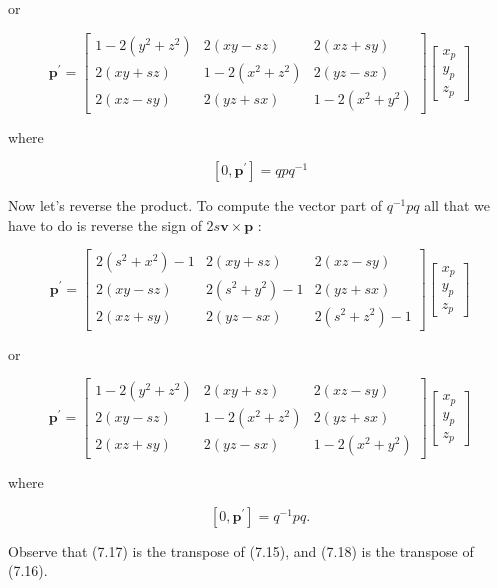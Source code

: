 or

$$
\mathbf{p}^{\prime}=\left[\begin{array}{ccc}
1-2\left(y^{2}+z^{2}\right) & 2(x y-s z) & 2(x z+s y) \\
2(x y+s z) & 1-2\left(x^{2}+z^{2}\right) & 2(y z-s x) \\
2(x z-s y) & 2(y z+s x) & 1-2\left(x^{2}+y^{2}\right)
\end{array}\right]\left[\begin{array}{l}
x_{p} \\
y_{p} \\
z_{p}
\end{array}\right]
$$

where

$$
\left[0, \mathbf{p}^{\prime}\right]=q p q^{-1}
$$

Now let's reverse the product. To compute the vector part of $q^{-1} p q$ all that we have to do is reverse the sign of $2 s \mathbf{v} \times \mathbf{p}$ :

$$
\mathbf{p}^{\prime}=\left[\begin{array}{ccc}
2\left(s^{2}+x^{2}\right)-1 & 2(x y+s z) & 2(x z-s y) \\
2(x y-s z) & 2\left(s^{2}+y^{2}\right)-1 & 2(y z+s x) \\
2(x z+s y) & 2(y z-s x) & 2\left(s^{2}+z^{2}\right)-1
\end{array}\right]\left[\begin{array}{l}
x_{p} \\
y_{p} \\
z_{p}
\end{array}\right]
$$

or

$$
\mathbf{p}^{\prime}=\left[\begin{array}{ccc}
1-2\left(y^{2}+z^{2}\right) & 2(x y+s z) & 2(x z-s y) \\
2(x y-s z) & 1-2\left(x^{2}+z^{2}\right) & 2(y z+s x) \\
2(x z+s y) & 2(y z-s x) & 1-2\left(x^{2}+y^{2}\right)
\end{array}\right]\left[\begin{array}{l}
x_{p} \\
y_{p} \\
z_{p}
\end{array}\right]
$$

where

$$
\left[0, \mathbf{p}^{\prime}\right]=q^{-1} p q .
$$

Observe that (7.17) is the transpose of (7.15), and (7.18) is the transpose of (7.16).

